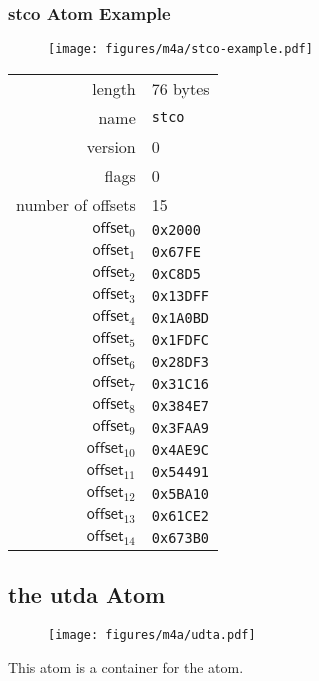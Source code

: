 \subsubsection{stco Atom Example}
\begin{figure}[h]
  \texttt{[image: figures/m4a/stco-example.pdf]}
\end{figure}
\par
\noindent
{
\begin{tabular}{rl}
  \textsf{length} & 76 bytes \\
  \textsf{name} & \texttt{stco} \\
  \textsf{version} & 0 \\
  \textsf{flags} & 0 \\
  \textsf{number of offsets} & 15 \\
  $\textsf{offset}_{0}$ & \texttt{0x2000} \\
  $\textsf{offset}_{1}$ & \texttt{0x67FE} \\
  $\textsf{offset}_{2}$ & \texttt{0xC8D5} \\
  $\textsf{offset}_{3}$ & \texttt{0x13DFF} \\
  $\textsf{offset}_{4}$ & \texttt{0x1A0BD} \\
  $\textsf{offset}_{5}$ & \texttt{0x1FDFC} \\
  $\textsf{offset}_{6}$ & \texttt{0x28DF3} \\
  $\textsf{offset}_{7}$ & \texttt{0x31C16} \\
  $\textsf{offset}_{8}$ & \texttt{0x384E7} \\
  $\textsf{offset}_{9}$ & \texttt{0x3FAA9} \\
  $\textsf{offset}_{10}$ & \texttt{0x4AE9C} \\
  $\textsf{offset}_{11}$ & \texttt{0x54491} \\
  $\textsf{offset}_{12}$ & \texttt{0x5BA10} \\
  $\textsf{offset}_{13}$ & \texttt{0x61CE2} \\
  $\textsf{offset}_{14}$ & \texttt{0x673B0} \\
\end{tabular}
}

\clearpage

\subsection{the utda Atom}
\label{atom:udta}
\begin{figure}[h]
  \texttt{[image: figures/m4a/udta.pdf]}
\end{figure}
\par
\noindent
This atom is a container for the \hyperref[atom:meta]{} atom.

